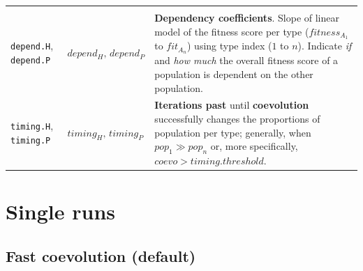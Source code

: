 \documentclass[]{book}
\begin{document}
\begin{longtable}[]{@{}lll@{}}
\begin{minipage}[t]{0.34\columnwidth}
\end{minipage}\tabularnewline
\begin{minipage}[t]{0.36\columnwidth}\raggedright
\texttt{depend.H}, \texttt{depend.P}\strut
\end{minipage} & \begin{minipage}[t]{0.21\columnwidth}\raggedright
\(depend_{H},\,depend_{P}\)\strut
\end{minipage} & \begin{minipage}[t]{0.34\columnwidth}\raggedright
\textbf{Dependency coefficients}. Slope of linear model of the fitness score per type (\(fitness_{A_1}\) to \(fit_{A_n}\)) using type index (\(1\) to \(n\)). Indicate \emph{if} and \emph{how much} the overall fitness score of a population is dependent on the other population.\strut
\end{minipage}\tabularnewline
\begin{minipage}[t]{0.36\columnwidth}\raggedright
\texttt{timing.H}, \texttt{timing.P}\strut
\end{minipage} & \begin{minipage}[t]{0.21\columnwidth}\raggedright
\(timing_{H},\,timing_{P}\)\strut
\end{minipage} & \begin{minipage}[t]{0.34\columnwidth}\raggedright
\textbf{Iterations past} until \textbf{coevolution} successfully changes the proportions of population per type; generally, when \(pop_1\gg pop_n\) or, more specifically, \(coevo>timing.threshold\).\strut
\end{minipage}\tabularnewline
\bottomrule
\end{longtable}

\hypertarget{single-runs}{%
\chapter{Single runs}\label{single-runs}}

\newpage

\hypertarget{fast-coevolution-default}{%
\section{Fast coevolution (default)}\label{fast-coevolution-default}}
\end{document}

